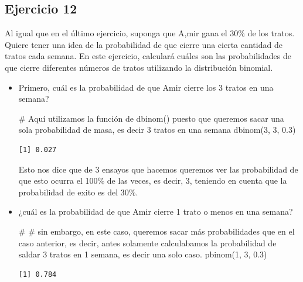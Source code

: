 \documentclass[
  letterpaper,
  DIV=11,
  numbers=noendperiod]{scrreprt}
\newenvironment{Shaded}{\begin{snugshade}}{\end{snugshade}}
\newcommand{\CommentTok}[1]{\textcolor[rgb]{0.37,0.37,0.37}{#1}}
\newcommand{\DecValTok}[1]{\textcolor[rgb]{0.68,0.00,0.00}{#1}}
\newcommand{\FloatTok}[1]{\textcolor[rgb]{0.68,0.00,0.00}{#1}}
\newcommand{\FunctionTok}[1]{\textcolor[rgb]{0.28,0.35,0.67}{#1}}
\newcommand{\NormalTok}[1]{\textcolor[rgb]{0.00,0.23,0.31}{#1}}
\begin{document}
\hypertarget{ejercicio-12}{%
\subsection{Ejercicio 12}\label{ejercicio-12}}

Al igual que en el último ejercicio, suponga que A,mir gana el 30\% de
los tratos. Quiere tener una idea de la probabilidad de que cierre una
cierta cantidad de tratos cada semana. En este ejercicio, calculará
cuáles son las probabilidades de que cierre diferentes números de tratos
utilizando la distribución binomial.

\begin{itemize}
\item
  Primero, cuál es la probabilidad de que Amir cierre los 3 tratos en
  una semana?

\begin{Shaded}
\begin{Highlighting}[]
\CommentTok{\# Aquí utilizamos la función de dbinom() puesto que queremos sacar una sola probabilidad de masa, es decir 3 tratos en una semana }
\FunctionTok{dbinom}\NormalTok{(}\DecValTok{3}\NormalTok{, }\DecValTok{3}\NormalTok{, }\FloatTok{0.3}\NormalTok{)}
\end{Highlighting}
\end{Shaded}

\begin{verbatim}
[1] 0.027
\end{verbatim}

  Esto nos dice que de 3 ensayos que hacemos queremos ver las
  probabilidad de que esto ocurra el 100\% de las veces, es decir, 3,
  teniendo en cuenta que la probabilidad de exito es del 30\%.
\item
  ¿cuál es la probabilidad de que Amir cierre 1 trato o menos en una
  semana?

\begin{Shaded}
\begin{Highlighting}[]
\CommentTok{\# }
\CommentTok{\# sin embargo, en este caso, queremos sacar más probabilidades que en el caso anterior, es decir, antes solamente calculabamos la probabilidad de saldar 3 tratos en 1 semana, es decir una solo caso. }
\FunctionTok{pbinom}\NormalTok{(}\DecValTok{1}\NormalTok{, }\DecValTok{3}\NormalTok{, }\FloatTok{0.3}\NormalTok{)}
\end{Highlighting}
\end{Shaded}

\begin{verbatim}
[1] 0.784
\end{verbatim}


\end{itemize}
\end{document}
